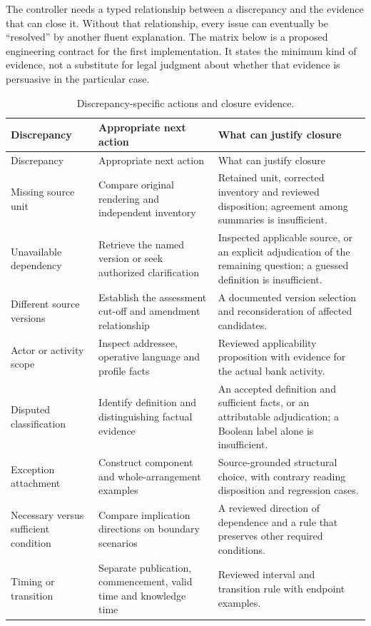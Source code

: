\documentclass[12pt,a4paper,oneside,openany]{book}
\begin{document}
The controller needs a typed relationship between a discrepancy and the evidence
that can close it. Without that relationship, every issue can eventually be
``resolved'' by another fluent explanation. The matrix below is a proposed
engineering contract for the first implementation. It states the minimum kind of
evidence, not a substitute for legal judgment about whether that evidence is
persuasive in the particular case.

\begin{longtable}{@{}P{27mm}P{56mm}P{65mm}@{}}
\caption{Discrepancy-specific actions and closure evidence.}\label{tab:resolution-matrix}\\
\toprule
Discrepancy & Appropriate next action & What can justify closure\\\midrule\endfirsthead
\toprule Discrepancy & Appropriate next action & What can justify closure\\\midrule\endhead
Missing source unit & Compare original rendering and independent inventory & Retained unit, corrected inventory and reviewed disposition; agreement among summaries is insufficient.\\
Unavailable dependency & Retrieve the named version or seek authorized clarification & Inspected applicable source, or an explicit adjudication of the remaining question; a guessed definition is insufficient.\\
Different source versions & Establish the assessment cut-off and amendment relationship & A documented version selection and reconsideration of affected candidates.\\
Actor or activity scope & Inspect addressee, operative language and profile facts & Reviewed applicability proposition with evidence for the actual bank activity.\\
Disputed classification & Identify definition and distinguishing factual evidence & An accepted definition and sufficient facts, or an attributable adjudication; a Boolean label alone is insufficient.\\
Exception attachment & Construct component and whole-arrangement examples & Source-grounded structural choice, with contrary reading disposition and regression cases.\\
Necessary versus sufficient condition & Compare implication directions on boundary scenarios & A reviewed direction of dependence and a rule that preserves other required conditions.\\
Timing or transition & Separate publication, commencement, valid time and knowledge time & Reviewed interval and transition rule with endpoint examples.\\

\end{longtable}
\end{document}
